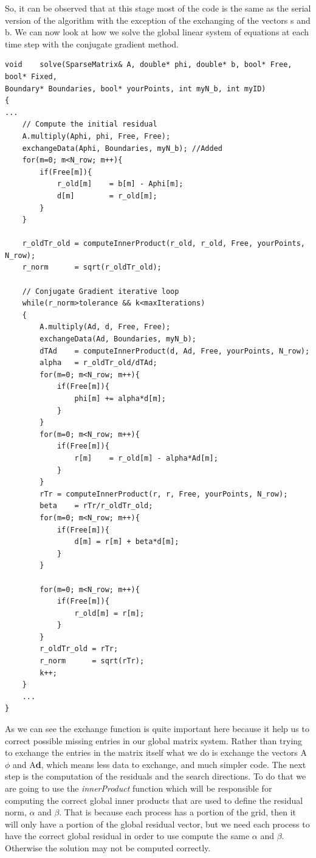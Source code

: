 \documentclass[12pt]{article}
\begin{document}
So, it can be observed that at this stage most of the code is the same as the serial version of the algorithm with the exception of the exchanging of the vectors s and b. We can now look at how we solve the global linear system of equations at each time step with the conjugate gradient method.

\begin{lstlisting}[style=MyC++Style]
void	solve(SparseMatrix& A, double* phi, double* b, bool* Free, bool* Fixed, 
Boundary* Boundaries, bool* yourPoints, int myN_b, int myID)
{
...
    // Compute the initial residual
	A.multiply(Aphi, phi, Free, Free);
	exchangeData(Aphi, Boundaries, myN_b); //Added
    for(m=0; m<N_row; m++){
        if(Free[m]){
            r_old[m]	= b[m] - Aphi[m];
            d[m]		= r_old[m];
        }
    }

    r_oldTr_old	= computeInnerProduct(r_old, r_old, Free, yourPoints, N_row);
    r_norm		= sqrt(r_oldTr_old);

    // Conjugate Gradient iterative loop
    while(r_norm>tolerance && k<maxIterations)
    {
    	A.multiply(Ad, d, Free, Free);
		exchangeData(Ad, Boundaries, myN_b);
		dTAd	= computeInnerProduct(d, Ad, Free, yourPoints, N_row);
		alpha  	= r_oldTr_old/dTAd;
		for(m=0; m<N_row; m++){
			if(Free[m]){
				phi[m] += alpha*d[m];
			}
		}
		for(m=0; m<N_row; m++){
			if(Free[m]){
				r[m]	= r_old[m] - alpha*Ad[m];
			}
		}
		rTr	= computeInnerProduct(r, r, Free, yourPoints, N_row);
		beta  	= rTr/r_oldTr_old;
		for(m=0; m<N_row; m++){
			if(Free[m]){
				d[m] = r[m] + beta*d[m];
			}
		}

		for(m=0; m<N_row; m++){
			if(Free[m]){
				r_old[m] = r[m];
			}
		}
		r_oldTr_old	= rTr;
		r_norm		= sqrt(rTr);
		k++;
	}
	...
}
\end{lstlisting}

As we can see the exchange function is quite important here because it help us to correct possible missing entries in our global matrix system. Rather than trying to exchange the entries in the matrix itself what we do is exchange the vectors A$\phi$ and A\textbf{d}, which means less data to exchange, and much simpler code\cite{Steve13}. The next step is the computation of the residuals and the search directions. To do that we are going to use the \textit{innerProduct} function which will be responsible for computing the correct global inner products that are used to define the residual norm, $\alpha$ and $\beta$. That is because each process has a portion of the grid, then it will only have a portion of the global residual vector, but we need each process to have the correct global residual in order to use compute the same $\alpha$ and $\beta$. Otherwise the solution may not be computed correctly.
\end{document}
